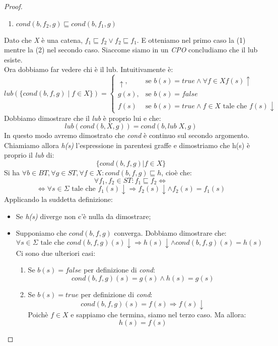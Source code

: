 \begin{proof}
\begin{enumerate}
  \item $cond(b,f_2,g) \sqsubseteq cond(b,f_1,g)$
  \end{enumerate}
  Dato che \emph{X} è una catena, $f_1 \sqsubseteq f_2 \lor f_2 \sqsubseteq f_1 $. E otteniamo nel primo caso la (1) mentre la (2) nel secondo caso. Siaccome siamo in un \emph{CPO} concludiamo che il lub esiste. \\
  Ora dobbiamo far vedere chi è il lub. Intuitivamente è:
  $$ lub( \{ cond(b,f,g) \; | \; f \in X \})= \begin{cases} \uparrow , & \mbox{se } b(s)=true \land \forall f \in X f(s) \uparrow \; \\ g(s), & \mbox{se } b(s)=false \; \\ f(s) & \mbox{se } b(s)=true \land f \in X \mbox{ tale che } f(s) \downarrow
  \end{cases} $$
  Dobbiamo dimostrare che il \emph{lub} è proprio lui e che:
  $$ lub(cond(b,X,g)) = cond(b, lub\; X, g) $$
  In questo modo avremo dimostrato che \emph{cond} è continuo sul secondo argomento. Chiamiamo allora \emph{h(s)} l'espressione in parentesi graffe e dimostriamo che h(s) è proprio il \emph{lub} di:
  $$ \{cond(b,f,g) | f \in X \} $$
  Si ha $ \forall b \in BT, \forall g \in ST, \forall f \in X : cond(b,f,g) \sqsubseteq h $, cioè che:
  $$ \forall f_1, f_2 \in ST : f_1 \sqsubseteq f_2 \Leftrightarrow $$
  $$ \Leftrightarrow \forall s \in \Sigma \mbox{ tale che } f_{1}(s) \downarrow \Rightarrow f_{2}(s) \downarrow \land f_{2}(s) = f_{1}(s) $$
  Applicando la suddetta definizione:
  \begin{itemize}
  \item Se \emph{h(s)} diverge non c'è nulla da dimostrare;
  \item Supponiamo che $cond(b,f,g)$ converga. Dobbiamo dimostrare che:
    $$ \forall s \in \Sigma \mbox{ tale che } cond(b,f,g)(s) \downarrow \Rightarrow h(s) \downarrow \land cond(b,f,g)(s) = h(s) $$
    Ci sono due ulteriori casi:
    \begin{enumerate}
    \item Se $b(s) = false$ per definizione di \emph{cond}:
      $$ cond(b,f,g)(s) = g(s) \land h(s) = g(s) $$
    \item Se $b(s)=true$ per definizione di \emph{cond}:
      $$ cond(b,f,g)(s) = f(s) \Rightarrow f(s) \downarrow $$
      Poichè $f \in X$ e sappiamo che termina, siamo nel terzo caso. Ma allora:
      $$ h(s) = f(s) $$
    \end{enumerate}
  \end{itemize}


\end{proof}
